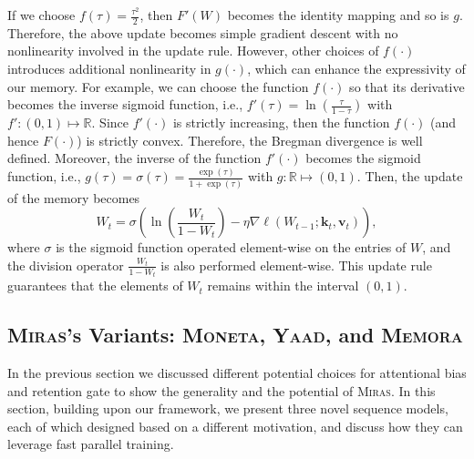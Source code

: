 \documentclass{article}
\newcommand{\framework}[0]{\textsc{Miras}}
\newcommand{\ymodel}[0]{\textsc{Yaad}}
\newcommand{\mmodel}[0]{\textsc{Moneta}}
\newcommand{\xmodel}[0]{\textsc{Memora}}
\newcommand{\vk}[0]{\mathbf{k}}
\newcommand{\vvv}[0]{\mathbf{v}}
\theoremstyle{plain}
\theoremstyle{definition}
\theoremstyle{remark}
\begin{document}
If we choose $f(\tau) = \frac{\tau^2}{2}$, then $F'(W)$ becomes the identity mapping and so is $g$. Therefore, the above update becomes simple gradient descent with no nonlinearity involved in the update rule. However, other choices of $f(\cdot)$ introduces additional nonlinearity in $g(\cdot)$, which can enhance the expressivity of our memory. For example, we can choose the function $f(\cdot)$ so that its derivative becomes the inverse sigmoid function, i.e., $f'(\tau) = \ln\left(\frac{\tau}{1-\tau}\right)$ with $f':(0,1)\mapsto\mathbb{R}$. Since $f'(\cdot)$ is strictly increasing, then the function $f(\cdot)$ (and hence $F(\cdot)$) is strictly convex. Therefore, the Bregman divergence is well defined. Moreover, the inverse of the function $f'(\cdot)$ becomes the sigmoid function, i.e., $g(\tau) = \sigma(\tau) = \frac{\exp(\tau)}{1+\exp(\tau)}$ with $g:\mathbb{R}\mapsto (0,1)$. Then, the update of the memory becomes
\[
 W_t = \sigma\left( \ln \left(\frac{W_t}{1-W_t}\right)-\eta \nabla \ell(W_{t-1};\vk_t, \vvv_t) \right),
\]
where $\sigma$ is the sigmoid function operated element-wise on the entries of $W$, and the division operator $\frac{W_t}{1-W_t}$ is also performed element-wise. This update rule guarantees that the elements of $W_t$ remains within the interval $(0,1)$.

\subsection{\framework's Variants: \mmodel, \ymodel, and \xmodel}\label{sec:Miras-variants}
In the previous section we discussed different potential choices for attentional bias and retention gate to show the generality and the potential of \framework. In this section, building upon our framework, we present three novel sequence models, each of which designed based on a different motivation, and discuss how they can leverage fast parallel training. 
\end{document}

